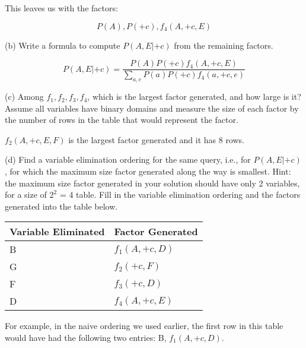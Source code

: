 \documentclass[11pt, answers]{exam}
\begin{document}
\begin{questions}
This leaves us with the factors:
	\begin{solution}
	$$P(A), P(+c), f_{4}(A, +c, E)$$
	\end{solution}
	
(b) Write a formula to compute $P(A,E|+c)$ from the remaining factors.

	\begin{solution}
	$$P(A,E|+c)=\dfrac{P(A)P(+c)f_{4}(A, +c, E)}{\sum_{a,e}P(a)P(+c)f_{4}(a, +c, e)}$$
	\end{solution}
	
(c) Among $f_1,f_2,f_3,f_4$, which is the largest factor generated, and how large is it? Assume all variables have binary domains and measure the size of each factor by the number of rows in the table that would represent the factor.

	\begin{solution}
	$f_2(A, +c, E, F)$ is the largest factor generated and it has 8 rows.
	\end{solution}
\newpage
(d) Find a variable elimination ordering for the same query, i.e., for $P(A,E|+c)$, for which the maximum size factor generated along the way is smallest. Hint: the maximum size factor generated in your solution should have only 2 variables, for a size of $2^2$ = 4 table. Fill in the variable elimination ordering and the factors generated into the table below.

\begin{table}[h!]
\centering
\begin{tabular}{|l|l|}
\hline
Variable Eliminated & Factor Generated \\ \hline
         B           &      $f_1(A,+c,D)$    \\ \hline
         G           &       $f_2(+c,F)$     \\ \hline
         F           &       $f_3(+c,D)$     \\ \hline
         D           &       $f_4(A,+c,E)$   \\ \hline
\end{tabular}
\end{table}

For example, in the naive ordering we used earlier, the first row in this table would have had the following two entries: B, $f_1(A,+c,D)$.
\end{questions}
\end{document}
